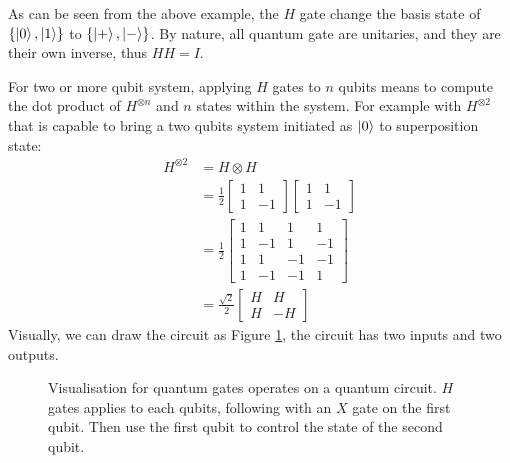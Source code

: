As can be seen from the above example, the $H$ gate change the basis state of $\{\left\vert{0}\right\rangle, \left\vert{1}\right\rangle\}$ to $\{\left\vert{+}\right\rangle, \left\vert{-}\right\rangle\}$.
By nature, all quantum gate are unitaries, and they are their own inverse, thus $HH = I$.

For two or more qubit system, applying $H$ gates to $n$ qubits means to compute the dot product of $H^{\otimes n}$ and $n$ states within the system.
For example with $H^{\otimes 2}$ that is capable to bring a two qubits system initiated as $\left\vert{0}\right\rangle$ to superposition state:
\begin{equation}
    \begin{split}
        H^{\otimes 2} & = H \otimes H \\
        & = \frac{1}{2} \begin{bmatrix}
            1 & 1  \\
            1 & -1
        \end{bmatrix}
        \begin{bmatrix}
            1 & 1  \\
            1 & -1
        \end{bmatrix} \\
        & = \frac{1}{2}
        \begin{bmatrix}
            1 & 1  & 1  & 1  \\
            1 & -1 & 1  & -1 \\
            1 & 1  & -1 & -1 \\
            1 & -1 & -1 & 1
        \end{bmatrix} \\
        & = \frac{\sqrt{2}}{2}\begin{bmatrix}
            H & H  \\
            H & -H
        \end{bmatrix}
    \end{split}
\end{equation}
Visually, we can draw the circuit as Figure \ref{Fig: H gates}, the circuit has two inputs and two outputs.
\begin{figure}
    \centerline{
    }
    \caption{Visualisation for quantum gates operates on a quantum circuit. $H$ gates applies to each qubits, following with an $X$ gate on the first qubit. Then use the first qubit to control the state of the second qubit.}
    \label{Fig: H gates}
\end{figure}

